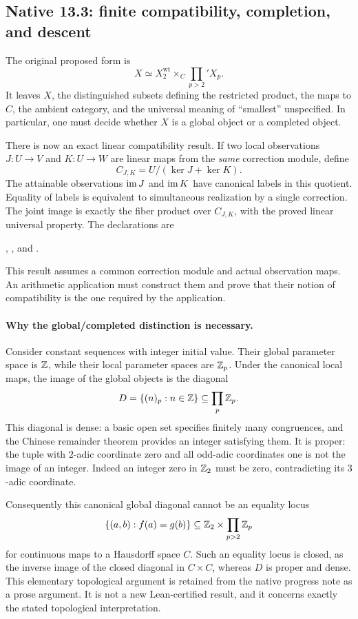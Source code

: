 \subsection{Native 13.3: finite compatibility, completion, and descent}
\label{subsec:native133}

The original proposed form is
\[
X\simeq X_2^{\mathrm{wt}}\times_C\prod_{p>2}'X_p.
\]
It leaves $X$, the distinguished subsets defining the restricted product,
the maps to $C$, the ambient category, and the universal meaning of
``smallest'' unspecified. In particular, one must decide whether $X$ is a
global object or a completed object.

There is now an exact linear compatibility result. If two local observations
$J:U\to V$ and $K:U\to W$ are linear maps from the \emph{same} correction
module, define
\[
C_{J,K}=U/(\ker J+\ker K).
\]
The attainable observations $\operatorname{im} J$ and $\operatorname{im} K$ have canonical labels in this
quotient. Equality of labels is equivalent to simultaneous realization by a
single correction. The joint image is exactly the fiber product over
$C_{J,K}$, with the proved linear universal property.
The declarations are
\begingroup\small\raggedright
{},
, and
.
\par\endgroup
This result assumes a common correction module and actual observation maps.
An arithmetic application must construct them and prove that their notion
of compatibility is the one required by the application.

\paragraph{Why the global/completed distinction is necessary.}
Consider constant sequences with integer initial value. Their global parameter
space is $\mathbb Z$, while their local parameter spaces are $\mathbb Z_p$. Under the
canonical local maps, the image of the global objects is the diagonal
\[
D=\{(n)_p:n\in\mathbb Z\}\subseteq\prod_p\mathbb Z_p.
\]
This diagonal is dense: a basic open set specifies finitely many congruences,
and the Chinese remainder theorem provides an integer satisfying them. It is
proper: the tuple with $2$-adic coordinate zero and all odd-adic coordinates
one is not the image of an integer. Indeed an integer zero in $\mathbb Z_2$ must be
zero, contradicting its $3$-adic coordinate.

Consequently this canonical global diagonal cannot be an equality locus
\[
\{(a,b):f(a)=g(b)\}
\subseteq \mathbb Z_2\times\prod_{p>2}\mathbb Z_p
\]
for continuous maps to a Hausdorff space $C$. Such an equality locus is closed,
as the inverse image of the closed diagonal in $C\times C$, whereas $D$ is
proper and dense. This elementary topological argument is retained from the
native progress note as a prose argument. It is not a new Lean-certified
result, and it concerns exactly the stated topological interpretation.

